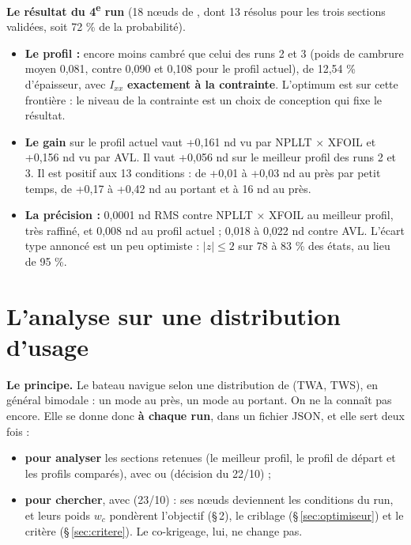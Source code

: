 \documentclass[10pt,a4paper]{article}
\begin{document}
\textbf{Le résultat du 4\textsuperscript{e} run} (18 nœuds de , dont 13 résolus pour les
trois sections validées, soit 72 \% de la probabilité).
\begin{itemize}
  \item \textbf{Le profil :} encore moins cambré que celui des runs 2 et 3 (poids de cambrure moyen 0,081,
        contre 0,090 et 0,108 pour le profil actuel), de 12,54 \% d'épaisseur, avec $I_{xx}$
        \textbf{exactement à la contrainte}. L'optimum est sur cette frontière : le niveau de la contrainte
        est un choix de conception qui fixe le résultat.
  \item \textbf{Le gain} sur le profil actuel vaut +0,161 nd vu par NPLLT × XFOIL et +0,156 nd vu par AVL. Il
        vaut +0,056 nd sur le meilleur profil des runs 2 et 3. Il est positif aux 13 conditions : de +0,01 à
        +0,03 nd au près par petit temps, de +0,17 à +0,42 nd au portant et à 16 nd au près.
  \item \textbf{La précision :} 0,0001 nd RMS contre NPLLT × XFOIL au meilleur profil, très raffiné, et
        0,008 nd au profil actuel ; 0,018 à 0,022 nd contre AVL. L'écart type annoncé est un peu optimiste :
        $|z|\le2$ sur 78 à 83 \% des états, au lieu de 95 \%.
\end{itemize}

\section{L'analyse sur une distribution d'usage}
\label{sec:profil}
\textbf{Le principe.} Le bateau navigue selon une distribution de (TWA, TWS), en général bimodale : un mode
au près, un mode au portant. On ne la connaît pas encore. Elle se donne donc \textbf{à chaque run}, dans un
fichier JSON, et elle sert deux fois :
\begin{itemize}
  \item \textbf{pour analyser} les sections retenues (le meilleur profil, le profil de départ et les profils
        comparés), avec  ou  (décision du 22/10) ;
  \item \textbf{pour chercher}, avec  (23/10) : ses nœuds deviennent les conditions du
        run, et leurs poids $w_c$ pondèrent l'objectif (§\,2), le criblage (§\,\ref{sec:optimiseur}) et le
        critère (§\,\ref{sec:critere}). Le co-krigeage, lui, ne change pas.
\end{itemize}
\end{document}
